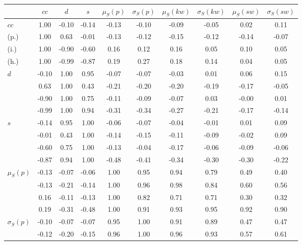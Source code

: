 \begin{table*}[h!]
\begin{center}
\begin{tabular}{| l | c | c | c | c | c | c | c | c | c |}\hline
 & $cc$ & $d$ & $s$ & $\mu_S(p)$ & $\sigma_S(p)$ & $\mu_S(kw)$ & $\sigma_S(kw)$ & $\mu_S(sw)$ & $\sigma_S(sw)$ \\\hline
$cc$ & 1.00  & -0.10  & -0.14  & -0.13  & -0.10  & -0.09  & -0.05  & 0.02  & 0.11 \\\hline
(p.) & 1.00  & 0.63  & -0.01  & -0.13  & -0.12  & -0.15  & -0.12  & -0.14  & -0.07 \\\hline
(i.) & 1.00  & -0.90  & -0.60  & 0.16  & 0.12  & 0.16  & 0.05  & 0.10  & 0.05 \\\hline
(h.) & 1.00  & -0.99  & -0.87  & 0.19  & 0.27  & 0.18  & 0.14  & 0.04  & 0.05 \\\hline
$d$ & -0.10  & 1.00  & 0.95  & -0.07  & -0.07  & -0.03  & 0.01  & 0.06  & 0.15 \\\hline
 & 0.63  & 1.00  & 0.43  & -0.21  & -0.20  & -0.20  & -0.19  & -0.17  & -0.05 \\\hline
 & -0.90  & 1.00  & 0.75  & -0.11  & -0.09  & -0.07  & 0.03  & -0.00  & 0.01 \\\hline
 & -0.99  & 1.00  & 0.94  & -0.31  & -0.34  & -0.27  & -0.21  & -0.17  & -0.14 \\\hline
$s$ & -0.14  & 0.95  & 1.00  & -0.06  & -0.07  & -0.04  & -0.01  & 0.01  & 0.09 \\\hline
 & -0.01  & 0.43  & 1.00  & -0.14  & -0.15  & -0.11  & -0.09  & -0.02  & 0.09 \\\hline
 & -0.60  & 0.75  & 1.00  & -0.13  & -0.04  & -0.17  & -0.06  & -0.09  & -0.06 \\\hline
 & -0.87  & 0.94  & 1.00  & -0.48  & -0.41  & -0.34  & -0.30  & -0.30  & -0.22 \\\hline
$\mu_S(p)$ & -0.13  & -0.07  & -0.06  & 1.00  & 0.95  & 0.94  & 0.79  & 0.49  & 0.40 \\\hline
 & -0.13  & -0.21  & -0.14  & 1.00  & 0.96  & 0.98  & 0.84  & 0.60  & 0.56 \\\hline
 & 0.16  & -0.11  & -0.13  & 1.00  & 0.82  & 0.71  & 0.71  & 0.30  & 0.32 \\\hline
 & 0.19  & -0.31  & -0.48  & 1.00  & 0.91  & 0.93  & 0.95  & 0.92  & 0.90 \\\hline
$\sigma_S(p)$ & -0.10  & -0.07  & -0.07  & 0.95  & 1.00  & 0.91  & 0.89  & 0.47  & 0.47 \\\hline
 & -0.12  & -0.20  & -0.15  & 0.96  & 1.00  & 0.96  & 0.93  & 0.57  & 0.61 \\\hline

\end{tabular}
\end{center}
\end{table*}
